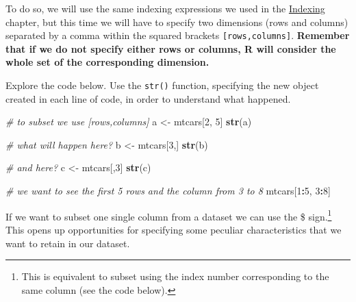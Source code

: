 \documentclass[
]{svmono}
\newenvironment{Shaded}{\begin{snugshade}}{\end{snugshade}}
\newcommand{\CommentTok}[1]{\textcolor[rgb]{0.56,0.35,0.01}{\textit{#1}}}
\newcommand{\DecValTok}[1]{\textcolor[rgb]{0.00,0.00,0.81}{#1}}
\newcommand{\FunctionTok}[1]{\textcolor[rgb]{0.13,0.29,0.53}{\textbf{#1}}}
\newcommand{\NormalTok}[1]{#1}
\newcommand{\OtherTok}[1]{\textcolor[rgb]{0.56,0.35,0.01}{#1}}
\newcommand{\SpecialCharTok}[1]{\textcolor[rgb]{0.81,0.36,0.00}{\textbf{#1}}}
\begin{document}
To do so, we will use the same indexing expressions we used in the
\protect\hyperlink{indexing}{Indexing} chapter, but this time we will have to specify two dimensions
(rows and columns) separated by a comma within the squared brackets
\texttt{{[}rows,columns{]}}. \textbf{Remember that if we do not specify either rows or
columns, R will consider the whole set of the corresponding dimension.}

Explore the code below. Use the \texttt{str()} function, specifying the new
object created in each line of code, in order to understand what
happened.

\begin{Shaded}
\begin{Highlighting}[]
\CommentTok{\# to subset we use [rows,columns]}
\NormalTok{a }\OtherTok{\textless{}{-}}\NormalTok{ mtcars[}\DecValTok{2}\NormalTok{, }\DecValTok{5}\NormalTok{]}
\FunctionTok{str}\NormalTok{(a)}

\CommentTok{\# what will happen here?}
\NormalTok{b }\OtherTok{\textless{}{-}}\NormalTok{ mtcars[}\DecValTok{3}\NormalTok{,]}
\FunctionTok{str}\NormalTok{(b)}

\CommentTok{\# and here?}
\NormalTok{c }\OtherTok{\textless{}{-}}\NormalTok{ mtcars[,}\DecValTok{3}\NormalTok{]}
\FunctionTok{str}\NormalTok{(c)}

\CommentTok{\# we want to see the first 5 rows and the column from 3 to 8}
\NormalTok{mtcars[}\DecValTok{1}\SpecialCharTok{:}\DecValTok{5}\NormalTok{, }\DecValTok{3}\SpecialCharTok{:}\DecValTok{8}\NormalTok{]}
\end{Highlighting}
\end{Shaded}

If we want to subset one single column from a dataset we can use the \$
sign.\footnote{This is equivalent to subset using the index number corresponding
  to the same column (see the code below).} This opens up opportunities for specifying some peculiar
characteristics that we want to retain in our dataset.
\end{document}
